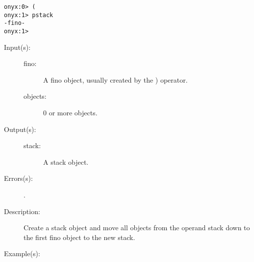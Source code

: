\begin{description}
\begin{description}
\begin{verbatim}
onyx:0> (
onyx:1> pstack
-fino-
onyx:1>
		\end{verbatim}
	\end{description}
\label{systemdict:sym_rp}
\index{\onyxop{}{)}{}}
\item[{\onyxop{fino objects}{)}{stack}}: ]
	\begin{description}\item[]
	\item[Input(s): ]
		\begin{description}\item[]
		\item[fino: ]
			A fino object, usually created by the ) operator.
		\item[objects: ]
			0 or more objects.
		\end{description}
	\item[Output(s): ]
		\begin{description}\item[]
		\item[stack: ]
			A stack object.
		\end{description}
	\item[Errors(s): ]
		\begin{description}\item[]
		\item[.]
		\end{description}
	\item[Description: ]
		Create a stack object and move all objects from the operand
		stack down to the first fino object to the new stack.
	\item[Example(s): ]\begin{verbatim}


\end{verbatim}
\end{description}
\end{description}
